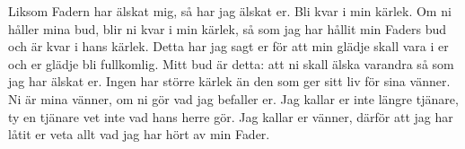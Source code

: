 {Liksom Fadern har älskat mig, så har jag älskat er. Bli kvar i min kärlek.
Om ni håller mina bud, blir ni kvar i min kärlek, så som jag har hållit min Faders bud och är kvar i hans kärlek.
Detta har jag sagt er för att min glädje skall vara i er och er glädje bli fullkomlig.
Mitt bud är detta: att ni skall älska varandra så som jag har älskat er.
Ingen har större kärlek än den som ger sitt liv för sina vänner.
Ni är mina vänner, om ni gör vad jag befaller er.
Jag kallar er inte längre tjänare, ty en tjänare vet inte vad hans herre gör. Jag kallar er vänner, därför att jag har låtit er veta allt vad jag har hört av min Fader.}